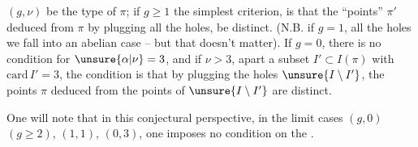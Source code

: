  $(g,\nu)$ be the type of $\pi$;  if $g\geq1$ the simplest criterion, is that the ``\inserted{$\Gamma^{\natural}$-}points''  $\pi'$ deduced from $\pi$ by plugging all the holes, be distinct.  (N.B. if $g=1$,    all the holes we fall into an abelian case -- but that doesn't matter). If $g=0$,  there is no condition for $\unsure{\alpha|\nu}=3$, and if $\nu>3$,  apart a  subset $I'\subset I(\pi)$ with $\mathrm{card}\,I'=3$, the condition is that by plugging the holes  $\unsure{I\setminus I'}$, the \inserted{$\Gamma^{\natural}$-}points  $\pi$ deduced from the points of $\unsure{I\setminus I'}$ are distinct.

One will note that in this conjectural perspective, in the limit cases $(g,0)$ $(g\geq2)$, $(1,1)$, $(0,3)$, one imposes no condition  on the .


